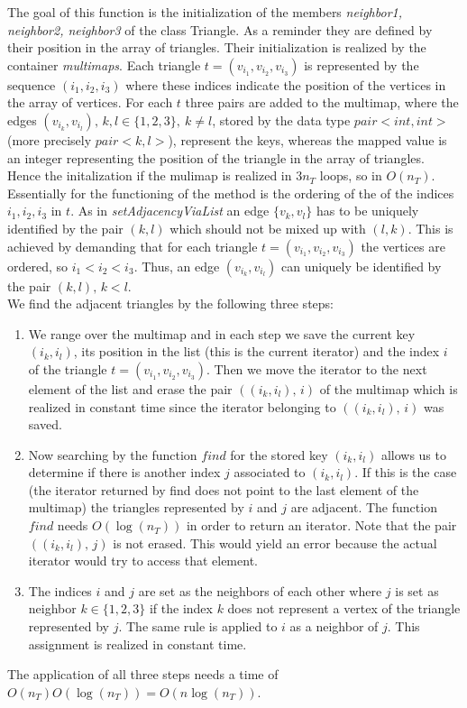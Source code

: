 \documentclass[10pt]{article}
\begin{document}
The goal of this function is the initialization of the members {\itshape neighbor1, neighbor2, neighbor3} of the class Triangle. As a reminder they are defined by their position in the array of triangles. Their initialization is realized by the container {\itshape multimaps}. 
Each triangle $ t = (v_{i_1},v_{i_2},v_{i_3}) $ is represented by the sequence $ (i_1,i_2,i_3) $ where these indices indicate the position of the vertices in the array of vertices. 
For each $ t $ three pairs are added to the multimap, where the edges $(v_{i_k},v_{i_l}), \, k,l \in \{1,2,3\}, \ k \neq l $, stored by the data type $ pair<int,int> $ (more precisely $ pair<k,l> $), represent the keys, whereas the mapped value is an integer representing the position of the triangle in the array of triangles. Hence the initalization if the mulimap is realized in $ 3n_T $ loops, so in $ O(n_T) $. \\
Essentially for the functioning of the method is the ordering of the of the indices $ i_1,i_2,i_3 $ in $ t $. As in {\itshape setAdjacencyViaList} an edge $ \{ v_k, v_l\} $
 has to be uniquely identified by the pair $ (k,l) $ which should not be mixed up with $(l,k) $. This is achieved by demanding that for each triangle $ t =  (v_{i_1},v_{i_2},v_{i_3})$ the vertices are ordered, so $ i_1 < i_2 < i_3 $. Thus, an edge $(v_{i_k},v_{i_l}) $ can uniquely be identified by the pair $ (k,l), \, k < l $. \\
 We find the adjacent triangles by the following three steps: 
 \begin{enumerate}
 	\item 
 	We range over the multimap and in each step we save the current key $ (i_k,i_l) $, its position in the list (this is the current iterator) and the index $ i $ of the triangle $ t = (v_{i_1},v_{i_2},v_{i_3})  $. Then we move the iterator to the next element of the list and erase the pair $ ( (i_k,i_l), \, i) $ of the multimap which is realized in constant time since the iterator belonging to $ ( (i_k,i_l), \, i) $ was saved. 
 	\item 
 	Now searching by the function $ find $ for the stored key $ (i_k,i_l) $ allows us to determine if there is another index $ j $ associated to $ (i_k,i_l) $. If this is the case (the iterator returned by find does not point to the last element of the multimap) the triangles represented by $i$ and $j$ are adjacent. The function  $ find $ needs $ O(\log(n_T)) $ in order to return an iterator. 
 	Note that the pair $ ( (i_k,i_l), \, j) $ is not erased. This would yield an error because the actual iterator would try to access that element. 
 	\item 
 	The indices $ i $ and $ j $ are set as the neighbors of each other where $ j $ is set as neighbor $ k \in \{1,2,3\} $ if the index $k$ does not represent a vertex of the triangle represented by $ j $. The same rule is applied to $ i $ as a neighbor of $ j $. 
 	This assignment is realized in constant time. 
  \end{enumerate}
The application of all three steps needs a time of $ O(n_T)O(\log(n_T)) = O(n\log(n_T)) $. 
\end{document}
